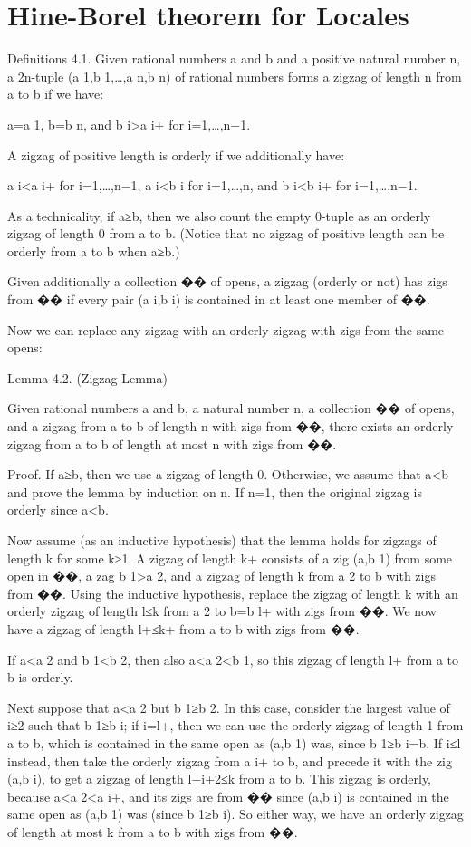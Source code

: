 \chapter{Hine-Borel theorem for Locales}




Definitions 4.1. Given rational numbers a and b and a positive natural number n, a 2n-tuple (a 1,b 1,…,a n,b n) of rational numbers forms a zigzag of length n from a to b if we have:

    a=a 1, b=b n, and
    b i>a i+ for i=1,…,n−1.

A zigzag of positive length is orderly if we additionally have:

    a i<a i+ for i=1,…,n−1,
    a i<b i for i=1,…,n, and
    b i<b i+ for i=1,…,n−1.

As a technicality, if a≥b, then we also count the empty 0-tuple as an orderly zigzag of length 0 from a to b. (Notice that no zigzag of positive length can be orderly from a to b when a≥b.)

Given additionally a collection �� of opens, a zigzag (orderly or not) has zigs from �� if every pair (a i,b i) is contained in at least one member of ��.

Now we can replace any zigzag with an orderly zigzag with zigs from the same opens:

Lemma 4.2. (Zigzag Lemma)

Given rational numbers a and b, a natural number n, a collection �� of opens, and a zigzag from a to b of length n with zigs from ��, there exists an orderly zigzag from a to b of length at most n with zigs from ��.

Proof. If a≥b, then we use a zigzag of length 0. Otherwise, we assume that a<b and prove the lemma by induction on n. If n=1, then the original zigzag is orderly since a<b.

Now assume (as an inductive hypothesis) that the lemma holds for zigzags of length k for some k≥1. A zigzag of length k+ consists of a zig (a,b 1) from some open in ��, a zag b 1>a 2, and a zigzag of length k from a 2 to b with zigs from ��. Using the inductive hypothesis, replace the zigzag of length k with an orderly zigzag of length l≤k from a 2 to b=b l+ with zigs from ��. We now have a zigzag of length l+≤k+ from a to b with zigs from ��.

If a<a 2 and b 1<b 2, then also a<a 2<b 1, so this zigzag of length l+ from a to b is orderly.

Next suppose that a<a 2 but b 1≥b 2. In this case, consider the largest value of i≥2 such that b 1≥b i; if i=l+, then we can use the orderly zigzag of length 1 from a to b, which is contained in the same open as (a,b 1) was, since b 1≥b i=b. If i≤l instead, then take the orderly zigzag from a i+ to b, and precede it with the zig (a,b i), to get a zigzag of length l−i+2≤k from a to b. This zigzag is orderly, because a<a 2<a i+, and its zigs are from �� since (a,b i) is contained in the same open as (a,b 1) was (since b 1≥b i). So either way, we have an orderly zigzag of length at most k from a to b with zigs from ��.

